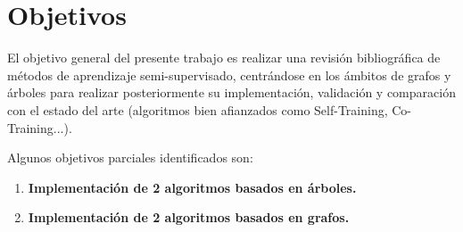 
\cleardoublepage

\chapter{Objetivos}
\label{objetivos}

El objetivo general del presente trabajo es realizar una revisión bibliográfica de métodos de aprendizaje semi-supervisado, centrándose en los ámbitos de grafos y árboles para realizar posteriormente su implementación, validación y comparación con el estado del arte (algoritmos bien afianzados como Self-Training, Co-Training...).

\medskip

Algunos objetivos parciales identificados son:
\begin{enumerate}[label=\destacado{\arabic*.}]
  \setlength\itemsep{1em}
  \item \textbf{Implementación de 2 algoritmos basados en árboles.}

  \item \textbf{Implementación de 2 algoritmos basados en grafos.}
\end{enumerate}
